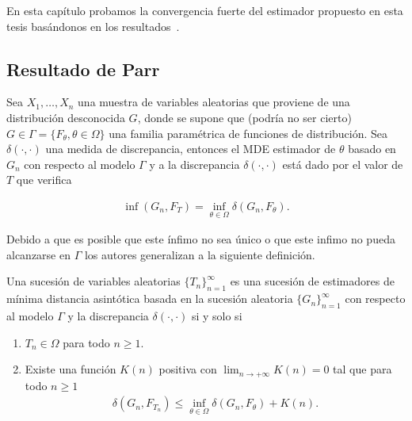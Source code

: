 En esta capítulo probamos la convergencia fuerte del estimador propuesto en esta tesis basándonos en los resultados~\cite{cao1995minimum,parr1982}.

\subsection{Resultado de Parr}




Sea $X_1, \ldots, X_n$ una muestra de variables aleatorias que proviene de una distribución desconocida $G$, donde se supone que (podría no ser cierto) $G \in \Gamma=\{F_\theta, \theta \in \Omega\}$ una familia paramétrica de funciones de distribución. Sea $\delta(\cdot,\cdot)$ una medida de discrepancia, entonces el MDE estimador de $\theta$ basado en $G_n$ con respecto al modelo $\Gamma$ y a la discrepancia $\delta(\cdot,\cdot)$ está dado por el valor de $T$ que verifica

\begin{align}
\inf(G_n,F_T)=\inf\limits_{\theta \in \Omega} \delta(G_n,F_\theta).
\end{align}

Debido a que es posible que este ínfimo no sea único o que este infimo no pueda alcanzarse en $\Gamma$ los autores generalizan a la siguiente definición.

\begin{definition}
	Una sucesión de variables aleatorias $\{T_n\}_{n=1}^{\infty}$ es una sucesión de estimadores de mínima distancia asintótica basada en la sucesión aleatoria $\{G_n\}_{n=1}^{\infty}$ con respecto al modelo $\Gamma$ y la discrepancia $\delta(\cdot,\cdot)$ si y solo si
	\begin{enumerate}
		\item $T_n \in \Omega$ para todo $n\geq 1.$
		\item Existe una función $K(n)$ positiva con $\lim_{n\to+\infty} K(n)=0$ tal que para todo $n\geq 1$
		\begin{align}
			\delta(G_n,F_{T_n}) \leq \inf_{\theta \in \Omega} 	\delta(G_n,F_{\theta}) + K(n).
		\end{align}
	\end{enumerate}
\end{definition}

